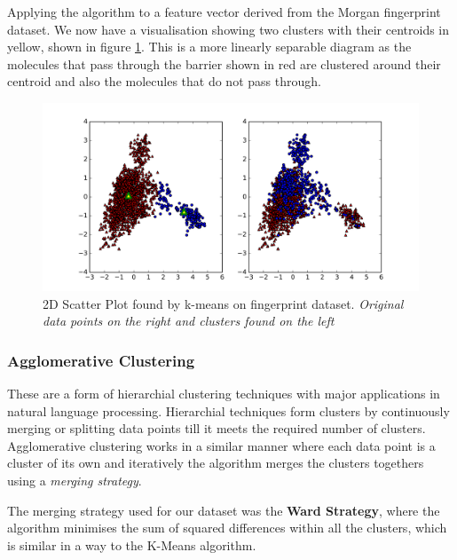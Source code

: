 \documentclass[a4paper,12pt]{report}
\begin{document}
			Applying the algorithm to a feature vector derived from the Morgan fingerprint dataset. We now have a visualisation showing two clusters with their centroids in yellow, shown in figure \ref{fig:kmeans_morgan_scatter}. This is a more linearly separable diagram as the molecules that pass through the barrier shown in red are clustered around their centroid and also the molecules that do not pass through.
			\begin{figure}[H]
				\centering
				\includegraphics[width=\textwidth,scale=1,totalheight=0.4\textheight]{images/kmeans_morgan_scatter}
				\caption{2D Scatter Plot found by k-means on fingerprint dataset. \textit{Original data points on the right and clusters found on the left}}
				\label{fig:kmeans_morgan_scatter}
			\end{figure}
			
			
			\subsubsection{Agglomerative Clustering}
			These are a form of hierarchial clustering techniques with major applications in natural language processing. Hierarchial techniques form clusters by continuously merging or splitting data points till it meets the required number of clusters. Agglomerative clustering works in a similar manner where each data point is a cluster of its own and iteratively the algorithm merges the clusters togethers using a \textit{merging strategy}. 
			
			The merging strategy used for our dataset was the \textbf{Ward Strategy}, where the algorithm minimises the sum of squared differences within all the clusters, which is similar in a way to the K-Means algorithm.
			
\end{document}
